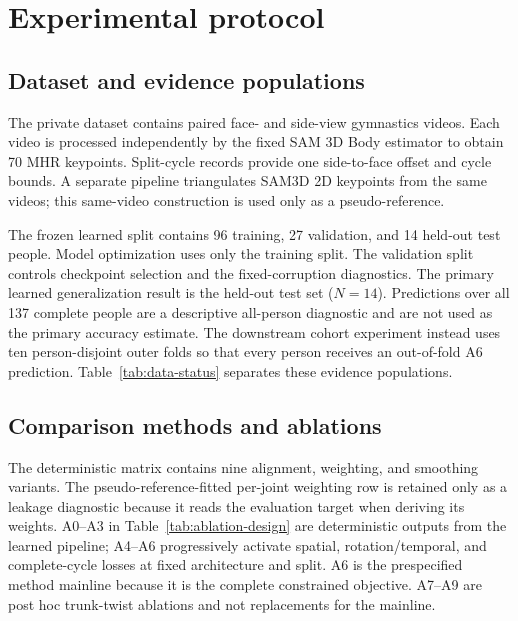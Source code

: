 \section{Experimental protocol}
\label{sec:experiments}

\subsection{Dataset and evidence populations}

The private dataset contains paired face- and side-view gymnastics videos.
Each video is processed independently by the fixed SAM 3D Body estimator to
obtain 70 MHR keypoints. Split-cycle records provide one side-to-face offset and
cycle bounds. A separate pipeline triangulates SAM3D 2D keypoints from the same
videos; this same-video construction is used only as a pseudo-reference.

The frozen learned split contains 96 training, 27 validation, and 14 held-out
test people. Model optimization uses only the training split. The validation
split controls checkpoint selection and the fixed-corruption diagnostics. The
primary learned generalization result is the held-out test set ($N=14$).
Predictions over all 137 complete people are a descriptive all-person
diagnostic and are not used as the primary accuracy estimate. The downstream
cohort experiment instead uses ten person-disjoint outer folds so that every
person receives an out-of-fold A6 prediction. Table~\ref{tab:data-status}
separates these evidence populations.



\subsection{Comparison methods and ablations}

The deterministic matrix contains nine alignment, weighting, and smoothing
variants. The pseudo-reference-fitted per-joint weighting row is retained only
as a leakage diagnostic because it reads the evaluation target when deriving
its weights. A0--A3 in Table~\ref{tab:ablation-design} are deterministic outputs
from the learned pipeline; A4--A6 progressively activate spatial,
rotation/temporal, and complete-cycle losses at fixed architecture and split.
A6 is the prespecified method mainline because it is the complete constrained
objective. A7--A9 are post hoc trunk-twist ablations and not replacements for
the mainline.


